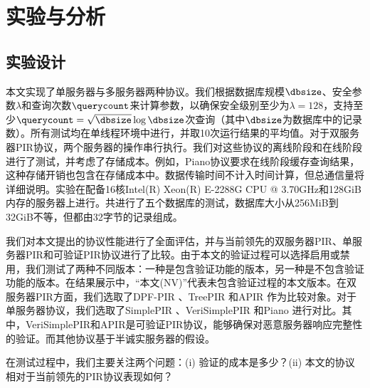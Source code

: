\section{实验与分析}
\label{sec:evaluation}
\subsection{实验设计}
本文实现了单服务器与多服务器两种协议。我们根据数据库规模$\dbsize$、安全参数$\lambda$和查询次数$\querycount$来计算参数，以确保安全级别至少为$\lambda=128$，支持至少$\querycount=\sqrt{\dbsize}\log{\dbsize}$次查询（其中$\dbsize$为数据库中的记录数）。所有测试均在单线程环境中进行，并取10次运行结果的平均值。对于双服务器PIR协议，两个服务器的操作串行执行。我们对这些协议的离线阶段和在线阶段进行了测试，并考虑了存储成本。例如，Piano协议要求在线阶段缓存查询结果，这种存储开销也包含在存储成本中。数据传输时间不计入时间计算，但总通信量将详细说明。实验在配备16核Intel(R) Xeon(R) E-2288G CPU @ 3.70GHz和128GiB内存的服务器上进行。共进行了五个数据库的测试，数据库大小从256MiB到32GiB不等，但都由32字节的记录组成。

我们对本文提出的协议性能进行了全面评估，并与当前领先的双服务器PIR、单服务器PIR和可验证PIR协议进行了比较。由于本文的验证过程可以选择启用或禁用，我们测试了两种不同版本：一种是包含验证功能的版本，另一种是不包含验证功能的版本。在结果展示中，“本文(NV)”代表未包含验证过程的本文版本。在双服务器PIR方面，我们选取了DPF-PIR \cite{EC:GilIsh14}、TreePIR \cite{C:LazPap23}和APIR \cite{APIR}作为比较对象。对于单服务器协议，我们选取了SimplePIR \cite{SimplePIR}、VeriSimplePIR \cite{VeriSimplePIR}和Piano \cite{Piano}进行对比。其中，VeriSimplePIR和APIR是可验证PIR协议，能够确保对恶意服务器响应完整性的验证。而其他协议基于半诚实服务器的假设。

在测试过程中，我们主要关注两个问题：(i) 验证的成本是多少？(ii) 本文的协议相对于当前领先的PIR协议表现如何？

